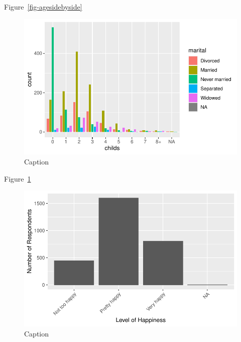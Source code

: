 \documentclass[
  letterpaper,
  DIV=11,
  numbers=noendperiod]{scrartcl}
\begin{document}
Figure~\ref{fig-agesidebyside}

\begin{figure}

{\centering \includegraphics{paper_files/figure-pdf/fig-childsandmarital-1.pdf}

}

\caption{\label{fig-childsandmarital}Caption}

\end{figure}

Figure~\ref{fig-childsandmarital}

\begin{figure}

{\centering \includegraphics{paper_files/figure-pdf/fig-happiness-1.pdf}

}

\caption{\label{fig-happiness}Caption}

\end{figure}
\end{document}
